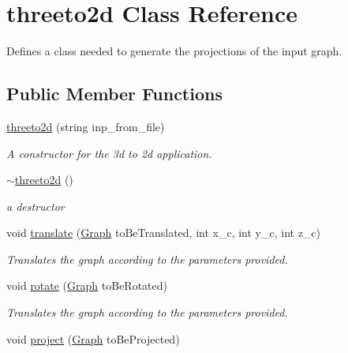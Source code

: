 \hypertarget{classthreeto2d}{}\section{threeto2d Class Reference}
\label{classthreeto2d}


Defines a class needed to generate the projections of the input graph.  


\subsection*{Public Member Functions}
\begin{DoxyCompactItemize}
\item 
\mbox{\hyperlink{classthreeto2d_a12ef3feb5556b9bf3bb6387e093acfcf}{threeto2d}} (string inp\+\_\+from\+\_\+file)
\begin{DoxyCompactList}\small\item\em A constructor for the 3d to 2d application. \end{DoxyCompactList}\item 
\mbox{\label{classthreeto2d_a3b41e0e988970c1758e959beb8c62855}} 
\mbox{\hyperlink{classthreeto2d_a3b41e0e988970c1758e959beb8c62855}{$\sim$threeto2d}} ()
\begin{DoxyCompactList}\small\item\em a destructor \end{DoxyCompactList}\item 
void \mbox{\hyperlink{classthreeto2d_a18267c9cf2d7f7abd85da846cb7d4519}{translate}} (\mbox{\hyperlink{class_graph}{Graph}} to\+Be\+Translated, int x\+\_\+c, int y\+\_\+c, int z\+\_\+c)
\begin{DoxyCompactList}\small\item\em Translates the graph according to the parameters provided. \end{DoxyCompactList}\item 
void \mbox{\hyperlink{classthreeto2d_a8e600dd9c439eb6d608138c73a5a42e8}{rotate}} (\mbox{\hyperlink{class_graph}{Graph}} to\+Be\+Rotated)
\begin{DoxyCompactList}\small\item\em Translates the graph according to the parameters provided. \end{DoxyCompactList}\item 
void \mbox{\hyperlink{classthreeto2d_ad7100bc6fd715ffdd1ff34e174217e9e}{project}} (\mbox{\hyperlink{class_graph}{Graph}} to\+Be\+Projected)

\end{DoxyCompactItemize}
